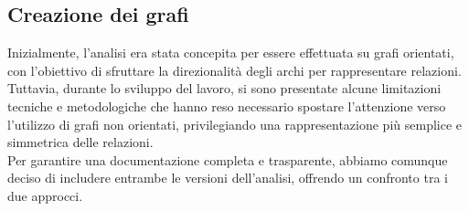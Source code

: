 \documentclass[12pt]{article}
\begin{document}
	\subsection{Creazione dei grafi}
	Inizialmente, l'analisi era stata concepita per essere effettuata su grafi orientati, con l'obiettivo di sfruttare la direzionalità degli archi per rappresentare relazioni.\\
	Tuttavia, durante lo sviluppo del lavoro, si sono presentate alcune limitazioni tecniche e metodologiche che hanno reso necessario spostare l'attenzione verso l'utilizzo di grafi non orientati, privilegiando una rappresentazione più semplice e simmetrica delle relazioni.\\ 
	Per garantire una documentazione completa e trasparente, abbiamo comunque deciso di includere entrambe le versioni dell'analisi, offrendo un confronto tra i due approcci.
	
\end{document}
